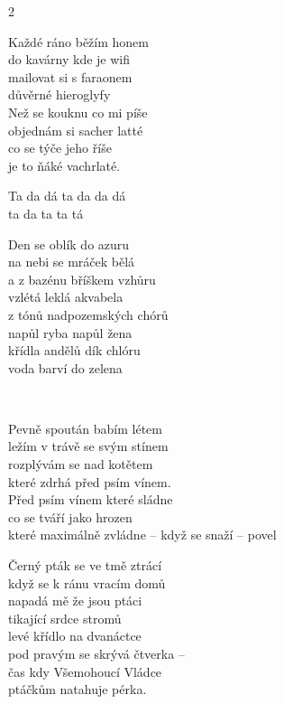 \begin{multicols}{2}

\ve{}
Každé ráno běžím honem \\
do kavárny kde je wifi \\
mailovat si s faraonem \\
důvěrné hieroglyfy \\
Než se kouknu co mi píše \\
objednám si sacher latté \\
co se týče jeho říše \\
je to ňáké vachrlaté. 

\cho{}
Ta da dá ta da da dá \\
ta da ta ta tá 

\columnbreak{}

\ve{}
Den se oblík do azuru\ch{ }\\
na nebi se mráček bělá\\
a z bazénu bříškem vzhůru \\
vzlétá leklá akvabela\\
z tónů nadpozemských chórů\\
napůl ryba napůl žena\\
křídla andělů dík chlóru\\
voda barví do zelena

\cho{} \ \\

\end{multicols}


\ve{}
Pevně spoután babím létem\\
ležím v trávě se svým stínem\\
rozplývám se nad kotětem\\
které zdrhá před psím vínem.\\
Před psím vínem které sládne\\
co se tváří jako hrozen\\
které maximálně zvládne -- když se snaží -- povel  

\cho{}

\ve{}
Černý pták se ve tmě ztrácí\\
když se k ránu vracím domů\\
napadá mě že jsou ptáci\\
tikající srdce stromů\\
levé křídlo na dvanáctce\\
pod pravým se skrývá čtverka --\\ 
čas kdy Všemohoucí Vládce\\
ptáčkům natahuje pérka.

\cho{}



\esong
